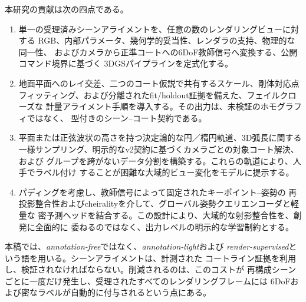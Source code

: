 本研究の貢献は次の四点である。

\begin{enumerate}
  \item 単一の受理済みシーンアライメントを、任意の数のレンダリングビューに対する
  RGB、内部パラメータ、幾何学的妥当性、レンダラの支持、物理的な\KP{}同一性、
  およびカメラから正準コートへの6DoF教師信号へ変換する、公開コマンド境界に基づく
  3DGSパイプラインを定式化する。

  \item 地面平面へのレイ交差、二つのコート仮説で共有するスケール、剛体対応点
  フィッティング、および分離されたfit/holdout証拠を備えた、フェイルクローズな
  計量アライメント手順を導入する。その出力は、未検証のホモグラフィではなく、
  型付きのシーン--コート契約である。

  \item 平面または正弦波状の高さを持つ決定論的な円／楕円軌道、3D弧長に関する
  一様サンプリング、明示的なv2契約に基づくカメラごとの対象コート解決、および
  グループを跨がないデータ分割を構築する。これらの軌道により、人手でラベル付け
  することが困難な大域的ビュー変化をモデルに提示する。

  \item パディングを考慮し、教師信号によって固定されたキーポイント--姿勢の
  再投影整合性およびcheiralityを介して、グローバル姿勢クエリエンコーダと軽量な
  密予測ヘッドを結合する。この設計により、大域的な射影整合性を、創発に全面的に
  委ねるのではなく、出力レベルの明示的な学習制約とする。
\end{enumerate}

本稿では、\emph{annotation-free}ではなく、\emph{annotation-light}および
\emph{render-supervised}という語を用いる。シーンアライメントは、計測された
コートライン証拠を利用し、検証されなければならない。削減されるのは、このコストが
再構成シーンごとに一度だけ発生し、受理されたすべてのレンダリングフレームには
6DoFおよび密なラベルが自動的に付与されるという点にある。
